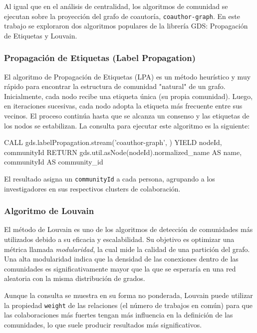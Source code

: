 \documentclass[journal]{IEEEtran}
\begin{document}
Al igual que en el análisis de centralidad, los algoritmos de comunidad se ejecutan sobre la proyección del grafo de coautoría, \texttt{coauthor-graph}. En este trabajo se exploraron dos algoritmos populares de la librería GDS: Propagación de Etiquetas y Louvain.

\subsubsection{Propagación de Etiquetas (Label Propagation)}
El algoritmo de Propagación de Etiquetas (LPA) es un método heurístico y muy rápido para encontrar la estructura de comunidad "natural" de un grafo. Inicialmente, cada nodo recibe una etiqueta única (su propia comunidad). Luego, en iteraciones sucesivas, cada nodo adopta la etiqueta más frecuente entre sus vecinos. El proceso continúa hasta que se alcanza un consenso y las etiquetas de los nodos se estabilizan. La consulta para ejecutar este algoritmo es la siguiente:

\begin{sflisting}[style=sparql,caption= Detección de comunidades con Propagación de Etiquetas,label=codigo_lpa]
	CALL gds.labelPropagation.stream('coauthor-graph', {})
	YIELD nodeId, communityId
	RETURN gds.util.asNode(nodeId).normalized_name AS name,
		communityId AS community_id
\end{sflisting}

El resultado asigna un \texttt{communityId} a cada persona, agrupando a los investigadores en sus respectivos clusters de colaboración.

\subsubsection{Algoritmo de Louvain}
El método de Louvain es uno de los algoritmos de detección de comunidades más utilizados debido a su eficacia y escalabilidad. Su objetivo es optimizar una métrica llamada \textit{modularidad}, la cual mide la calidad de una partición del grafo. Una alta modularidad indica que la densidad de las conexiones dentro de las comunidades es significativamente mayor que la que se esperaría en una red aleatoria con la misma distribución de grados.

Aunque la consulta se muestra en su forma no ponderada, Louvain puede utilizar la propiedad \texttt{weight} de las relaciones (el número de trabajos en común) para que las colaboraciones más fuertes tengan más influencia en la definición de las comunidades, lo que suele producir resultados más significativos.
\end{document}
